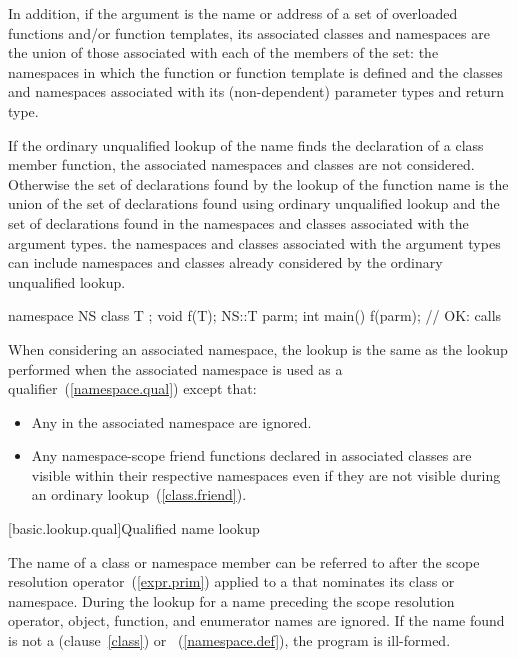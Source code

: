 In addition, if the argument is the name or address of a set of
overloaded functions and/or function templates, its associated classes
and namespaces are the union of those associated with each of the
members of the set: the namespaces in which the function or function template
is defined and the classes and namespaces associated with its (non-dependent)
parameter types and return type.

\pnumalt
If the ordinary unqualified lookup of the name finds the declaration of a
class member function, the associated namespaces and classes are not
considered. Otherwise the set of declarations found by the lookup of the
function name is the union of the set of declarations found using ordinary
unqualified lookup and the set of declarations found in the namespaces and
classes associated with the argument types.
\enternote the namespaces and classes
associated with the argument types can include namespaces and classes
already considered by the ordinary unqualified lookup. \exitnote
\enterexample

\begin{codeblock}
namespace NS {
    class T { };
    void f(T);
}
NS::T parm;
int main() {
    f(parm);                    // OK: calls 
}
\end{codeblock}
\exitexampleb

\pnum
When considering an associated namespace, the lookup is the same as the
lookup performed when the associated namespace is used as a
qualifier~(\ref{namespace.qual}) except that:

\begin{itemize}
\item Any  in the associated namespace are
ignored.

\item Any namespace-scope friend functions declared in associated classes
are visible within their respective
namespaces even if they are not visible during an ordinary
lookup~(\ref{class.friend}).

\end{itemize}

[basic.lookup.qual]{Qualified name lookup}

\pnum
{}%
%
%
The name of a class or namespace member can be referred to after the
\tcode{::} scope resolution operator~(\ref{expr.prim}) applied to a
 that nominates its class or namespace.
During the lookup for a name preceding the \tcode{::} scope resolution
operator, object, function, and enumerator names are ignored. If the
name found is not a  (clause~\ref{class})
or ~(\ref{namespace.def}),
the program is ill-formed. \enterexample

